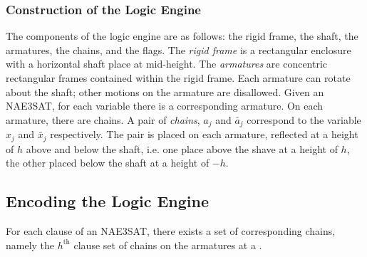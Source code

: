 \subsubsection{Construction of the Logic Engine}
The components of the logic engine are as follows: the rigid frame, the shaft, the armatures, 
the chains, and the flags.  The \textit{rigid frame} is a rectangular enclosure with a horizontal 
shaft place at mid-height.  The \textit{armatures} are concentric rectangular frames contained 
within the rigid frame.  Each armature can rotate about the shaft; other motions on the armature 
are disallowed.  Given an NAE3SAT, for each variable there is a corresponding armature. On each 
armature, there are chains.  A pair of \textit{chains}, $a_j$ and $\bar{a}_j$ correspond to the 
variable $x_j$ and $\bar{x}_j$ respectively.  The pair is placed on each armature, reflected at a 
height of $h$ above and below the shaft, i.e. one place above the shave at a height of $h$, the 
other placed below the shaft at a height of $-h$.

\subsection{Encoding the Logic Engine}
For each clause of an NAE3SAT, there exists a set of corresponding chains, namely the $h^\text{th}$ 
clause set of chains on the armatures at a .  